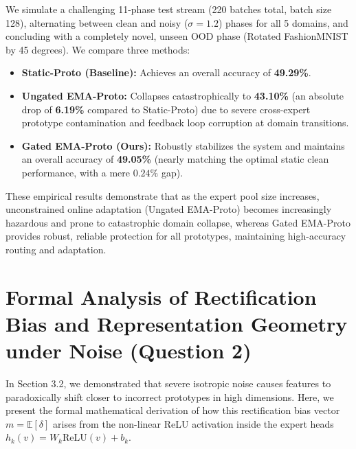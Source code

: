 \documentclass{article}
\theoremstyle{plain}
\theoremstyle{definition}
\theoremstyle{remark}
\begin{document}
    We simulate a challenging 11-phase test stream (220 batches total, batch size 128), alternating between clean and noisy ($\sigma = 1.2$) phases for all 5 domains, and concluding with a completely novel, unseen OOD phase (Rotated FashionMNIST by 45 degrees). We compare three methods:
    \begin{itemize}
    \item \textbf{Static-Proto (Baseline):} Achieves an overall accuracy of \textbf{49.29\%}.
    \item \textbf{Ungated EMA-Proto:} Collapses catastrophically to \textbf{43.10\%} (an absolute drop of \textbf{6.19\%} compared to Static-Proto) due to severe cross-expert prototype contamination and feedback loop corruption at domain transitions.
    \item \textbf{Gated EMA-Proto (Ours):} Robustly stabilizes the system and maintains an overall accuracy of \textbf{49.05\%} (nearly matching the optimal static clean performance, with a mere $0.24\%$ gap).
    \end{itemize}
    These empirical results demonstrate that as the expert pool size increases, unconstrained online adaptation (Ungated EMA-Proto) becomes increasingly hazardous and prone to catastrophic domain collapse, whereas Gated EMA-Proto provides robust, reliable protection for all prototypes, maintaining high-accuracy routing and adaptation.

    \section{Formal Analysis of Rectification Bias and Representation Geometry under Noise (Question 2)}\label{app:bias_proof}
In Section 3.2, we demonstrated that severe isotropic noise causes features to paradoxically shift closer to incorrect prototypes in high dimensions. Here, we present the formal mathematical derivation of how this rectification bias vector $m = \mathbb{E}[\delta]$ arises from the non-linear ReLU activation inside the expert heads $h_k(v) = W_k \text{ReLU}(v) + b_k$.
\end{document}

